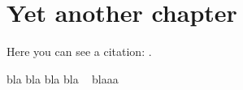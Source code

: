 \chapter{Yet another chapter}
Here you can see a citation: \cite{atc13}.

\newpage

bla bla bla bla
\newline~\newline
\lipsum[7]
\newpage
blaaa